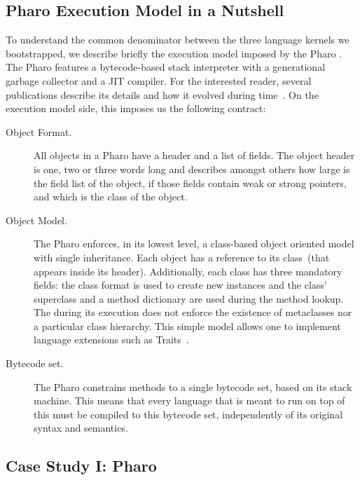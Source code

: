 \subsection{Pharo Execution Model in a Nutshell}\label{sec:pharo_execution_model}

To understand the common denominator between the three language kernels we bootstrapped, we describe briefly the execution model imposed by the Pharo \VM. The Pharo \VM features a bytecode-based stack interpreter with a generational garbage collector and a JIT compiler. For the interested reader, several publications describe its details and how it evolved during time~\cite{Gold83a,Inga97a,Mira11a}. On the execution model side, this \VM imposes us the following contract:

\begin{description}

\item[Object Format.] All objects in a Pharo \VM have a header and a list of fields. The object header is one, two or three words long and describes amongst others how large is the field list of the object, if those fields contain weak or strong pointers, and which is the class of the object.

\item[Object Model.] The Pharo \VM enforces, in its lowest level, a class-based object oriented model with single inheritance. Each object has a reference to its class~(that appears inside its header). Additionally, each class has three mandatory fields: the class format is used to create new instances and the class' superclass and a method dictionary are used during the method lookup. The \VM during its execution does not enforce the existence of metaclasses nor a particular class hierarchy. This simple model allows one to implement language extensions such as Traits~\cite{Scha03a}.

\item[Bytecode set.] The Pharo \VM constrains methods to a single bytecode set, based on its stack machine. This means that every language that is meant to run on top of this \VM must be compiled to this bytecode set, independently of its original syntax and semantics. 

\end{description}

\subsection{Case Study I: Pharo}\label{sec:bootstrap_pharo}

